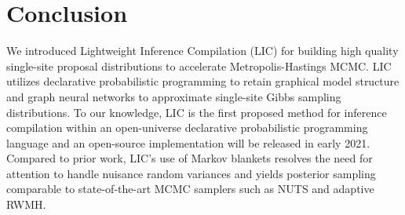 \documentclass[thesis.tex]{subfiles}
\begin{document}
\section{Conclusion}

We introduced Lightweight Inference Compilation (LIC) for building high
quality single-site proposal distributions to accelerate Metropolis-Hastings
MCMC. LIC utilizes declarative probabilistic programming to retain graphical
model structure and graph neural networks to approximate single-site Gibbs
sampling distributions. To our knowledge, LIC is the first proposed method
for inference compilation within an open-universe declarative probabilistic
programming language and an open-source implementation will be released in
early 2021. Compared to prior work, LIC's use of Markov blankets resolves the
need for attention to handle nuisance random variances and yields posterior
sampling comparable to state-of-the-art MCMC samplers such as NUTS and
adaptive RWMH.


% 
\end{document}

